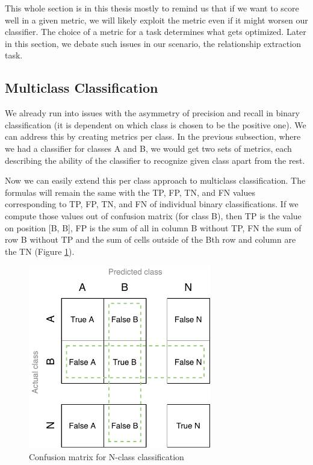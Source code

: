 This whole section is in this thesis mostly to remind us that if we want to score well in a given metric, we will likely exploit the metric even if it might worsen our classifier. The choice of a metric for a task determines what gets optimized. Later in this section, we debate such issues in our scenario, the relationship extraction task.





\subsection{Multiclass Classification}


We already run into issues with the asymmetry of precision and recall in binary classification (it is dependent on which class is chosen to be the positive one). We can address this by creating metrics per class. In the previous subsection, where we had a classifier for classes A and B, we would get two sets of metrics, each describing the ability of the classifier to recognize given class apart from the rest.

Now we can easily extend this per class approach to multiclass classification. The formulas will remain the same with the TP, FP, TN, and FN values corresponding to TP, FP, TN, and FN of individual binary classifications. If we compute those values out of confusion matrix (for class B), then TP is the value on position [B, B], FP is the sum of all in column B without TP, FN the sum of row B without TP and the sum of cells outside of the Bth row and column are the TN (Figure \ref{obr:BigCM}).



\begin{figure}[h]\centering
\includegraphics[width=80mm]{./img//Diplomka diagramy-Big Confusion matric}
\caption{Confusion matrix for N-class classification}
\label{obr:BigCM}
\end{figure}






